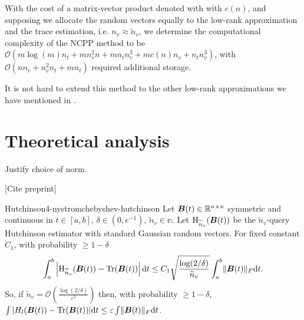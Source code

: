 With the cost of a matrix-vector product denoted with
with $c(n)$, and supposing we allocate the random vectors equally
to the low-rank approximation and the trace estimation, i.e. $n_v \approx \widetilde{n}_v$,
we determine the computational complexity of the \gls{NCPP}
method to be $\mathcal{O}(m \log(m) n_t + m n_v^2 n + m n_t n_v^2 +  m c(n) n_v + n_t n_v^3)$, with
$\mathcal{O}(n n_v + n_v^2 n_t + m n_t)$ required additional storage.


It is not hard to extend this method to the other low-rank approximations
we have mentioned in .


\section{Theoretical analysis}
\label{sec:4-nystromchebyshev-analysis}

Justify choice of norm.

[Cite preprint]

\begin{lemma}{Hutchinson}{4-nystromchebyshev-hutchinson}
    Let $\boldsymbol{B}(t) \in \mathbb{R}^{n \times n}$ symmetric and continuous in $t \in [a, b]$, $\delta \in (0, e^{-1})$, $\widetilde{n}_v \in \mathbb{n}$. Let $\operatorname{H}_{\widetilde{n}_v}(\boldsymbol{B}(t))$ be the $\widetilde{n}_v$-query Hutchinson estimator with standard Gaussian random vectors. For fixed constant $C_1$, with probability $\geq 1 - \delta$
    \begin{equation}
        \int_{a}^{b} \left| \operatorname{H}_{\widetilde{n}_v}(\boldsymbol{B}(t))  - \operatorname{Tr}(\boldsymbol{B}(t)) \right| \mathrm{d}t \leq C_1 \sqrt{\frac{\log(2/\delta)}{\widetilde{n}_v}} \int_{a}^{b} \lVert \boldsymbol{B}(t) \rVert_F \mathrm{d}t.
    \end{equation}
    So, if $\widetilde{n}_v = \mathcal{O}\left( \frac{\log(2/\delta)}{\varepsilon^2} \right)$ then, with probability $\geq 1 - \delta$, $\int |H_l(\boldsymbol{B}(t)) - \operatorname{Tr}(\boldsymbol{B}(t))| \mathrm{d}t \leq \varepsilon \int \lVert \boldsymbol{B}(t) \rVert_F \mathrm{d}t$.
\end{lemma}

